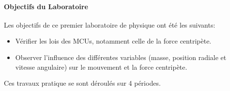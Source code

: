 \paragraph*{Objectifs du Laboratoire}

Les objectifs de ce premier laboratoire de physique ont été les suivants:
\begin{itemize}
    \item Vérifier les lois des MCUs, notamment celle de la force centripète.
    \item Observer l'influence des différentes variables (masse, position radiale et vitesse angulaire) sur le mouvement et la force centripète.
\end{itemize}

Ces travaux pratique se sont déroulés sur 4 périodes.
